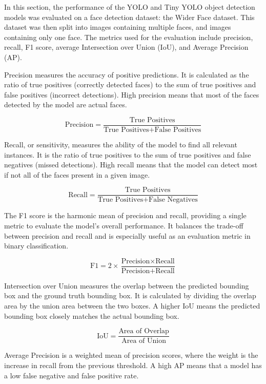 In this section, the performance of the YOLO and Tiny YOLO object detection models was evaluated on a face detection dataset: the Wider Face dataset. This dataset was then split into images containing multiple faces, and images containing only one face. The metrics used for the evaluation include precision, recall, F1 score, average Intersection over Union (IoU), and Average Precision (AP).

Precision measures the accuracy of positive predictions. It is calculated as the ratio of true positives (correctly detected faces) to the sum of true positives and false positives (incorrect detections). High precision means that most of the faces detected by the model are actual faces.

\[
\text{Precision} = \frac{\text{True Positives}}{\text{True Positives} + \text{False Positives}}
\]

Recall, or sensitivity, measures the ability of the model to find all relevant instances. It is the ratio of true positives to the sum of true positives and false negatives (missed detections). High recall means that the model can detect most if not all of the faces present in a given image.

\[
\text{Recall} = \frac{\text{True Positives}}{\text{True Positives} + \text{False Negatives}}
\]

The F1 score is the harmonic mean of precision and recall, providing a single metric to evaluate the model's overall performance. It balances the trade-off between precision and recall and is especially useful as an evaluation metric in binary classification.

\[
\text{F1} = 2 \times \frac{\text{Precision} \times \text{Recall}}{\text{Precision} + \text{Recall}}
\]

Intersection over Union measures the overlap between the predicted bounding box and the ground truth bounding box. It is calculated by dividing the overlap area by the union area between the two boxes. A higher IoU means the predicted bounding box closely matches the actual bounding box.

\[
\text{IoU} = \frac{\text{Area of Overlap}}{\text{Area of Union}}
\]
 
Average Precision is a weighted mean of precision scores, where the weight is the increase in recall from the previous threshold. A high AP means that a model has a low false negative and false positive rate.

